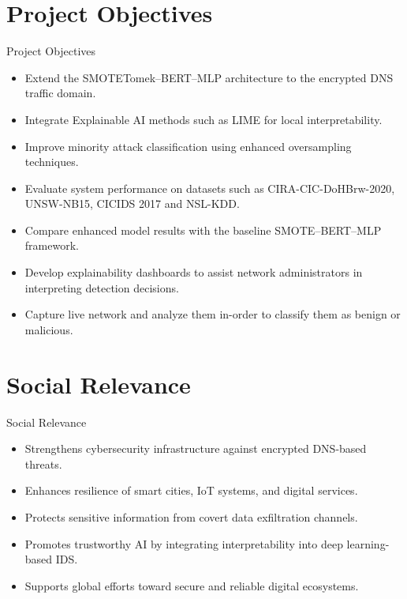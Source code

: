\documentclass[aspectratio=169,xcolor=dvipsnames]{beamer}
\begin{document}
\section{Project Objectives}
\begin{frame}{Project Objectives}
\begin{itemize}
\item Extend the SMOTETomek–BERT–MLP architecture to the encrypted DNS traffic domain.
\item Integrate Explainable AI methods such as LIME for local interpretability.
\item Improve minority attack classification using enhanced oversampling techniques.
\item Evaluate system performance on datasets such as CIRA-CIC-DoHBrw-2020, UNSW-NB15, CICIDS 2017 and NSL-KDD.
\item Compare enhanced model results with the baseline SMOTE–BERT–MLP framework.
\item Develop explainability dashboards to assist network administrators in interpreting detection decisions.
\item Capture live network and analyze them in-order to classify them as benign or malicious.
\end{itemize}
\end{frame}


\section{Social Relevance}
\begin{frame}{Social Relevance}
\begin{itemize}
\item Strengthens cybersecurity infrastructure against encrypted DNS-based threats.
\item Enhances resilience of smart cities, IoT systems, and digital services.
\item Protects sensitive information from covert data exfiltration channels.
\item Promotes trustworthy AI by integrating interpretability into deep learning-based IDS.
\item Supports global efforts toward secure and reliable digital ecosystems.
\end{itemize}
\end{frame}
\end{document}
